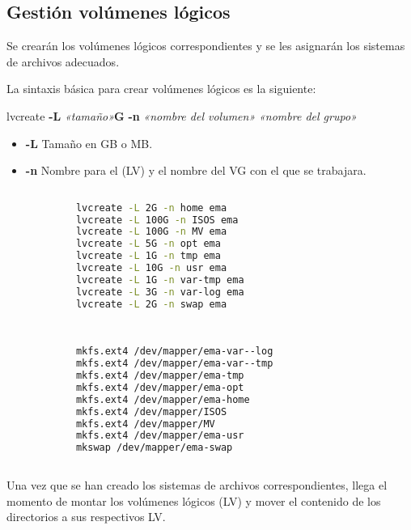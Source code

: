 	
		\subsection{Gestión volúmenes lógicos}
		
			Se crearán los volúmenes lógicos correspondientes y se les asignarán los sistemas de archivos adecuados.\par
			
			La sintaxis básica para crear volúmenes lógicos es la siguiente:
			
			lvcreate \textbf{-L} \textit{«tamaño»}\textbf{G} \textbf{-n} \textit{«nombre del volumen»} \textit{«nombre del grupo»}

			\begin{itemize}
	
				\item \textbf{-L} Tamaño en GB o MB.
				\item \textbf{-n} Nombre para el (LV) y el nombre del VG con el que se trabajara.
	
			\end{itemize}
			
			\begin{lstlisting}[language=Bash, caption=Creación de LV]
				
			lvcreate -L 2G -n home ema
			lvcreate -L 100G -n ISOS ema
			lvcreate -L 100G -n MV ema
			lvcreate -L 5G -n opt ema
			lvcreate -L 1G -n tmp ema
			lvcreate -L 10G -n usr ema
			lvcreate -L 1G -n var-tmp ema
			lvcreate -L 3G -n var-log ema
			lvcreate -L 2G -n swap ema
								
			\end{lstlisting}
		
			
			\begin{lstlisting}[language=Bash, caption=Crear Sistema de Archivo]
						
			mkfs.ext4 /dev/mapper/ema-var--log
			mkfs.ext4 /dev/mapper/ema-var--tmp
			mkfs.ext4 /dev/mapper/ema-tmp
			mkfs.ext4 /dev/mapper/ema-opt
			mkfs.ext4 /dev/mapper/ema-home
			mkfs.ext4 /dev/mapper/ISOS
			mkfs.ext4 /dev/mapper/MV
			mkfs.ext4 /dev/mapper/ema-usr
			mkswap /dev/mapper/ema-swap
			
			\end{lstlisting}
			
			\vspace{0.3cm}
				
		Una vez que se han creado los sistemas de archivos correspondientes, llega el momento de montar los volúmenes lógicos (LV) y mover el contenido de los directorios a sus respectivos LV.\par 
		
